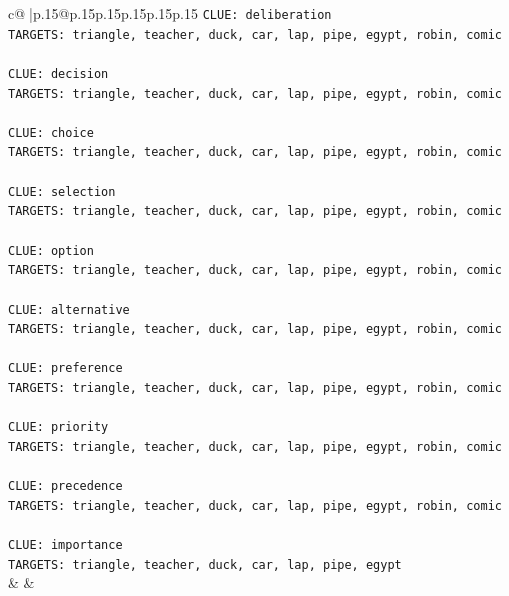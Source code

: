 \documentclass{article}
\begin{document}
{\begin{supertabular}{c@{$\;$}|p{.15\linewidth}@{}p{.15\linewidth}p{.15\linewidth}p{.15\linewidth}p{.15\linewidth}p{.15\linewidth}}
{{{\texttt{CLUE: deliberation} \\
\texttt{TARGETS: triangle, teacher, duck, car, lap, pipe, egypt, robin, comic} \\
\\ 
\texttt{CLUE: decision} \\
\texttt{TARGETS: triangle, teacher, duck, car, lap, pipe, egypt, robin, comic} \\
\\ 
\texttt{CLUE: choice} \\
\texttt{TARGETS: triangle, teacher, duck, car, lap, pipe, egypt, robin, comic} \\
\\ 
\texttt{CLUE: selection} \\
\texttt{TARGETS: triangle, teacher, duck, car, lap, pipe, egypt, robin, comic} \\
\\ 
\texttt{CLUE: option} \\
\texttt{TARGETS: triangle, teacher, duck, car, lap, pipe, egypt, robin, comic} \\
\\ 
\texttt{CLUE: alternative} \\
\texttt{TARGETS: triangle, teacher, duck, car, lap, pipe, egypt, robin, comic} \\
\\ 
\texttt{CLUE: preference} \\
\texttt{TARGETS: triangle, teacher, duck, car, lap, pipe, egypt, robin, comic} \\
\\ 
\texttt{CLUE: priority} \\
\texttt{TARGETS: triangle, teacher, duck, car, lap, pipe, egypt, robin, comic} \\
\\ 
\texttt{CLUE: precedence} \\
\texttt{TARGETS: triangle, teacher, duck, car, lap, pipe, egypt, robin, comic} \\
\\ 
\texttt{CLUE: importance} \\
\texttt{TARGETS: triangle, teacher, duck, car, lap, pipe, egypt} \\
            }
        }
    }
    & & \\ \\


\end{supertabular}}
\end{document}
